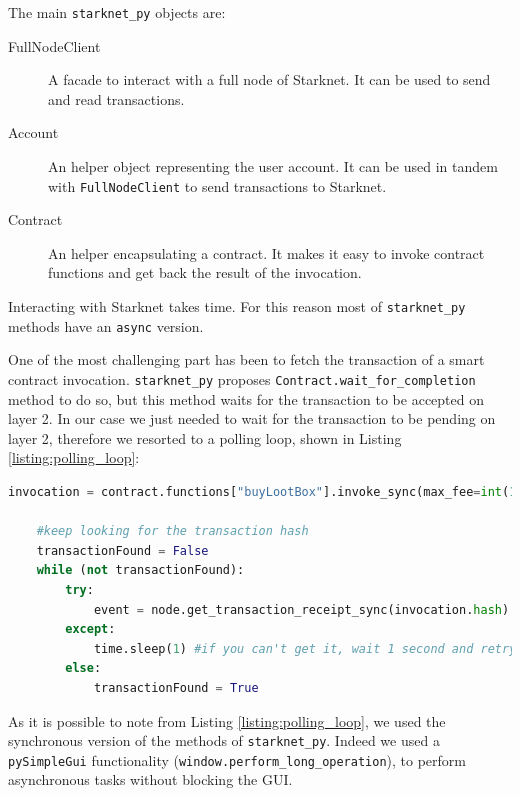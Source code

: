 \documentclass[12pt]{article}
\begin{document}
The main \verb|starknet_py| objects are:
\begin{description}
    \item[FullNodeClient] A facade to interact with a full node of Starknet. It can be used to send and read transactions.
    \item[Account] An helper object representing the user account. It can be used in tandem with \verb|FullNodeClient| to send transactions to Starknet.
    \item[Contract] An helper encapsulating a contract. It makes it easy to invoke contract functions and get back the result of the invocation.
\end{description}

Interacting with Starknet takes time. For this reason most of \verb|starknet_py| methods have an \verb|async| version.

One of the most challenging part has been to fetch the transaction of a smart contract invocation. \verb|starknet_py| proposes \verb|Contract.wait_for_completion| method to do so, but this method waits for the transaction to be accepted on layer 2. 
In our case we just needed to wait for the transaction to be pending on layer 2, therefore we resorted to a polling loop, shown in Listing \ref{listing:polling_loop}:
\begin{lstlisting}[language=python, style=python3, label=listing:polling_loop]
    invocation = contract.functions["buyLootBox"].invoke_sync(max_fee=int(1e15))
    
    #keep looking for the transaction hash
    transactionFound = False
    while (not transactionFound):
        try:
            event = node.get_transaction_receipt_sync(invocation.hash).events[0] #try to get the transaction from the node
        except:
            time.sleep(1) #if you can't get it, wait 1 second and retry
        else:
            transactionFound = True
\end{lstlisting}

As it is possible to note from Listing \ref{listing:polling_loop}, we used the synchronous version of the methods of \verb|starknet_py|. Indeed we used a \verb|pySimpleGui| functionality (\verb|window.perform_long_operation|), to perform asynchronous tasks without blocking the GUI.
\end{document}
